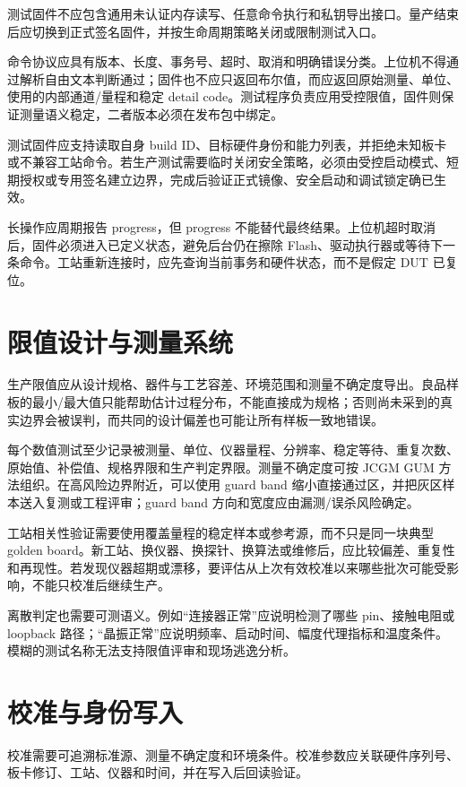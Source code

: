 测试固件不应包含通用未认证内存读写、任意命令执行和私钥导出接口。量产结束后应切换到正式签名固件，并按生命周期策略关闭或限制测试入口。

命令协议应具有版本、长度、事务号、超时、取消和明确错误分类。上位机不得通过解析自由文本判断通过；固件也不应只返回布尔值，而应返回原始测量、单位、使用的内部通道/量程和稳定 detail code。测试程序负责应用受控限值，固件则保证测量语义稳定，二者版本必须在发布包中绑定。

测试固件应支持读取自身 build ID、目标硬件身份和能力列表，并拒绝未知板卡或不兼容工站命令。若生产测试需要临时关闭安全策略，必须由受控启动模式、短期授权或专用签名建立边界，完成后验证正式镜像、安全启动和调试锁定确已生效。

长操作应周期报告 progress，但 progress 不能替代最终结果。上位机超时取消后，固件必须进入已定义状态，避免后台仍在擦除 Flash、驱动执行器或等待下一条命令。工站重新连接时，应先查询当前事务和硬件状态，而不是假定 DUT 已复位。

\section{限值设计与测量系统}

生产限值应从设计规格、器件与工艺容差、环境范围和测量不确定度导出。良品样板的最小/最大值只能帮助估计过程分布，不能直接成为规格；否则尚未采到的真实边界会被误判，而共同的设计偏差也可能让所有样板一致地错误。

每个数值测试至少记录被测量、单位、仪器量程、分辨率、稳定等待、重复次数、原始值、补偿值、规格界限和生产判定界限。测量不确定度可按 JCGM GUM 方法组织\cite{jcgm100}。在高风险边界附近，可以使用 guard band 缩小直接通过区，并把灰区样本送入复测或工程评审；guard band 方向和宽度应由漏测/误杀风险确定。

工站相关性验证需要使用覆盖量程的稳定样本或参考源，而不只是同一块典型 golden board。新工站、换仪器、换探针、换算法或维修后，应比较偏差、重复性和再现性。若发现仪器超期或漂移，要评估从上次有效校准以来哪些批次可能受影响，不能只校准后继续生产。

离散判定也需要可测语义。例如“连接器正常”应说明检测了哪些 pin、接触电阻或 loopback 路径；“晶振正常”应说明频率、启动时间、幅度代理指标和温度条件。模糊的测试名称无法支持限值评审和现场逃逸分析。

\section{校准与身份写入}

校准需要可追溯标准源、测量不确定度和环境条件。校准参数应关联硬件序列号、板卡修订、工站、仪器和时间，并在写入后回读验证。

